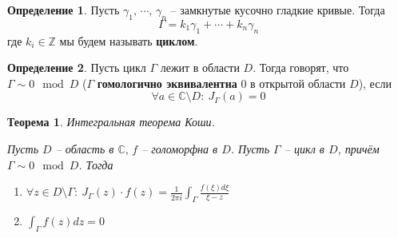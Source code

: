 \documentclass[a4paper,12pt]{article}
\theoremstyle{plain}
\newtheorem{theorem}{Теорема}[section]
\theoremstyle{definition}
\newtheorem{definition}{Определение}[section]
\theoremstyle{remark}
\begin{document}
\begin{definition}
	Пусть $\gamma_1,\, \cdots,\, \gamma_n$ -- замкнутые кусочно гладкие кривые. Тогда
	\[
		\Gamma = k_1\gamma_1 + \cdots + k_n\gamma_n
	\]
	где $k_i \in \mathbb{Z}$ мы будем называть \textbf{циклом}.
\end{definition}

\begin{definition}
	Пусть цикл $\Gamma$ лежит в области $D$. Тогда говорят, что $\Gamma \sim 0 \mod D$ ($\Gamma$ \textbf{гомологично эквивалентна} 0 в открытой области $D$), если 
	\[
		\forall a \in \mathbb{C} \setminus D :\: J_\Gamma(a) = 0
	\]
\end{definition}

\begin{theorem}
	Интегральная теорема Коши.

	Пусть $D$ -- область в $\mathbb{C},\, f$ -- голоморфна в $D$. Пусть $\Gamma$ -- цикл в $D$, причём $\Gamma \sim 0 \mod D$. Тогда
	\begin{enumerate}
		\item $\forall z \in D \setminus \Gamma :\: J_\Gamma(z)\cdot f(z) = \frac{1}{2\pi i}\int_\Gamma \frac{f(\xi)d\xi}{\xi - z}$
		\item $\int_\Gamma f(z) dz = 0$
	\end{enumerate}
\end{theorem}
\end{document}
